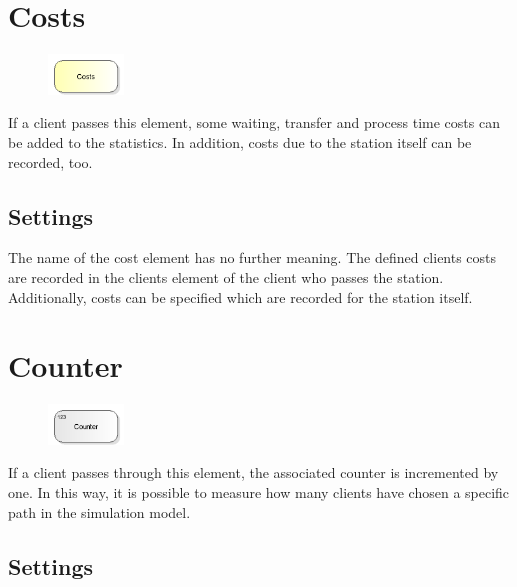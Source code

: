 \section{Costs}
\label{ref:ModelElementCosts}

\begin{figure}
\vspace{-22pt}
\includegraphics[width=2cm]{imageModelElementCosts.png}
\vspace{-22pt}
\end{figure}

If a client passes this element, some waiting, transfer and process time costs can be added to the
statistics. In addition, costs due to the station itself can be recorded, too.

\subsection*{Settings}

The name of the cost element has no further meaning. The defined clients costs are recorded in the clients element
of the client who passes the station. Additionally, costs can be specified which are recorded for the station itself.


\section{Counter}
\label{ref:ModelElementCounter}

\begin{figure}
\vspace{-22pt}
\includegraphics[width=2cm]{imageModelElementCounter.png}
\vspace{-22pt}
\end{figure}

If a client passes through this element, the associated counter is incremented by one.
In this way, it is possible to measure how many clients have chosen a specific path in the simulation model.

\subsection*{Settings}

